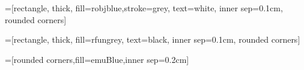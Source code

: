 =[rectangle, thick, fill=robjblue,stroke=grey, text=white,
                  inner sep=0.1cm, rounded corners]

=[rectangle, thick, fill=rfungrey, text=black,
                  inner sep=0.1cm, rounded corners]

=[rounded corners,fill=emuBlue,inner sep=0.2cm]  


\newcommand{\treeroot}[1]{%
\node[above] at (0,0) {#1};%
\setcounter{treeline}{0}
}

\newcommand{\treeentry}[2]{%
\draw[->] (#2-1,-\value{treeline}/2) -- (#2-1,-\value{treeline}/2-0.5) -- (#2+0.5,-\value{treeline}/2-0.5) node[right] {#1};
\stepcounter{treeline}
}

\newcommand{\altentry}[2]{%
\draw[->] (#2-1,-\value{treeline}/2) -- (#2-1,-\value{treeline}/2-0.5) -- (#2+0.5,-\value{treeline}/2-0.5) node[right] {#1};
\foreach \x in {1,...,#2}
{   \draw (\x-1,-\value{treeline}/2) -- (\x-1,-\value{treeline}/2-0.5);
}
\stepcounter{treeline}
}

\def\vec#1{\ensuremath{\bm{{#1}}}}
\def\mat#1{\vec{#1}}

